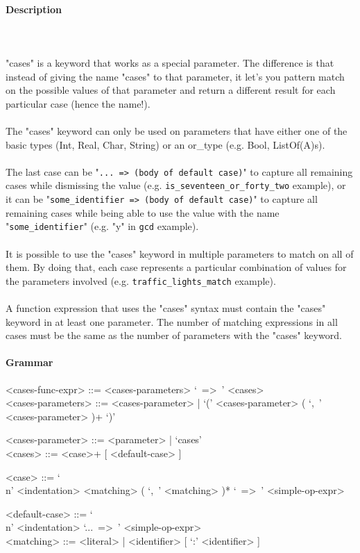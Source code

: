 \documentclass{article}
\def\pend{\mbox{} \\\\}
\begin{document}
\paragraph{Description}\pend
"cases" is a keyword that works as a special parameter. The difference is that 
instead of giving the name "cases" to that parameter, it let's you 
pattern match on the possible values of that parameter and return a different
result for each particular case (hence the name!). 
\\\\
The "cases" keyword can only be used on parameters that have either one of the 
basic types (Int, Real, Char, String) or an or\_type (e.g. Bool, ListOf(A)s).
\\\\
The last case can be "\texttt{... => (body of default case)}" to capture all
remaining cases while dismissing the value (e.g.
\texttt{is_seventeen_or_forty_two} example), or it can be
"\texttt{some_identifier => (body of default case)}" to capture all remaining
cases while being able to use the value with the name "\texttt{some_identifier}"
(e.g.  "y" in \texttt{gcd} example).
\\\\
It is possible to use the "cases" keyword in multiple parameters to match on all
of them. By doing that, each case represents a particular combination of values
for the parameters involved (e.g. \texttt{traffic_lights_match} example).
\\\\
A function expression that uses the "cases" syntax must contain the "cases"
keyword in at least one parameter. The number of matching expressions in 
all cases must be the same as the number of parameters with the "cases" keyword.

\paragraph{Grammar}
\begin{grammar}
<cases-func-expr> ::= <cases-parameters> `\ =>\ ' <cases> \\

<cases-parameters> ::=
<cases-parameter> | `(' <cases-parameter> ( `,\ ' <cases-parameter> )+ `)'

<cases-parameter> ::= <parameter> | `cases'\\

<cases> ::= <case>+ [ <default-case> ]

<case> ::=
`\\n' <indentation> <matching> ( `,\ ' <matching> )* `\ =>\ ' <simple-op-expr>

<default-case> ::= `\\n' <indentation> `...\ =>\ ' <simple-op-expr>\\

<matching> ::= <literal> | <identifier> [ `:' <identifier> ]
\end{grammar}
\end{document}
